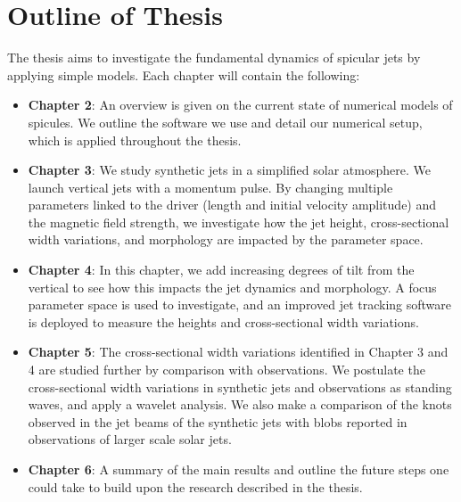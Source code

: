 \section{Outline of Thesis}
\label{section:outline}
The thesis aims to investigate the fundamental dynamics of spicular jets by applying simple models. Each chapter will contain the following:
\begin{itemize}
    \item {\bf{Chapter 2}}: An overview is given on the current state of numerical models of spicules. We outline the software we use and detail our numerical setup, which is applied throughout the thesis.
    \item {\bf{Chapter 3}}: We study synthetic jets in a simplified solar atmosphere. We launch vertical jets with a momentum pulse. By changing multiple parameters linked to the driver (length and initial velocity amplitude) and the magnetic field strength, we investigate how the jet height, cross-sectional width variations, and morphology are impacted by the parameter space.
    \item {\bf{Chapter 4}}: In this chapter, we add increasing degrees of tilt from the vertical to see how this impacts the jet dynamics and morphology. A focus parameter space is used to investigate, and an improved jet tracking software is deployed to measure the heights and cross-sectional width variations.     
    \item {\bf{Chapter 5}}: The cross-sectional width variations identified in Chapter 3 and 4 are studied further by comparison with observations. We postulate the cross-sectional width variations in synthetic jets and observations as standing waves, and apply a wavelet analysis. We also make a comparison of the knots observed in the jet beams of the synthetic jets with blobs reported in observations of larger scale solar jets.   
    \item {\bf{Chapter 6}}: A summary of the main results and outline the future steps one could take to build upon the research described in the thesis.  
\end{itemize}